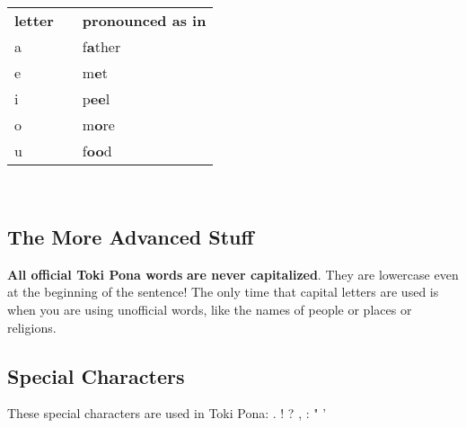 \begin{supertabular}{p{5,5cm}|ll}
\textbf{letter}   &&    \textbf{pronounced as in} \\ %
a   &&    f\textbf{a}ther \\ %
e   &&    m\textbf{e}t \\ %
i   &&    p\textbf{ee}l \\ %
o   &&    m\textbf{o}re \\ %
u   &&    f\textbf{oo}d \\ %
\end{supertabular} \\
%
\subsection*{The More Advanced Stuff}
%
\textbf{All official Toki Pona words} 
\textbf{are never capitalized}. They are lowercase even at the beginning of the sentence! 
The only time that capital letters are used is when you are using unofficial words, like the names of people or places or religions. 
%
%
\subsection*{Special Characters}
%
These special characters are used in Toki Pona: . ! ? , : " ' 
%
